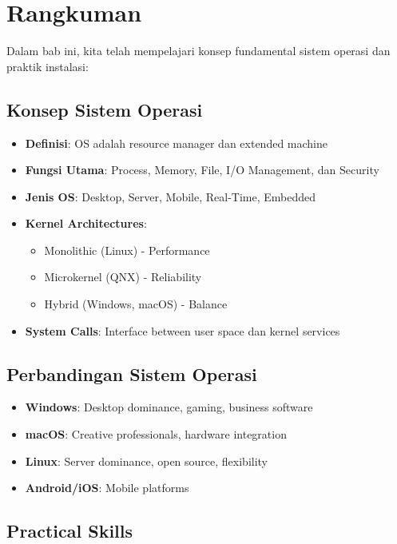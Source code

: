 \section{Rangkuman}
\label{sec:summary}

Dalam bab ini, kita telah mempelajari konsep fundamental sistem operasi dan praktik instalasi:

\subsection{Konsep Sistem Operasi}

\begin{itemize}
    \item \textbf{Definisi}: OS adalah resource manager dan extended machine
    \item \textbf{Fungsi Utama}: Process, Memory, File, I/O Management, dan Security
    \item \textbf{Jenis OS}: Desktop, Server, Mobile, Real-Time, Embedded
    \item \textbf{Kernel Architectures}:
    \begin{itemize}
        \item Monolithic (Linux) - Performance
        \item Microkernel (QNX) - Reliability
        \item Hybrid (Windows, macOS) - Balance
    \end{itemize}
    \item \textbf{System Calls}: Interface between user space dan kernel services
\end{itemize}

\subsection{Perbandingan Sistem Operasi}

\begin{itemize}
    \item \textbf{Windows}: Desktop dominance, gaming, business software
    \item \textbf{macOS}: Creative professionals, hardware integration
    \item \textbf{Linux}: Server dominance, open source, flexibility
    \item \textbf{Android/iOS}: Mobile platforms
\end{itemize}

\subsection{Practical Skills}

